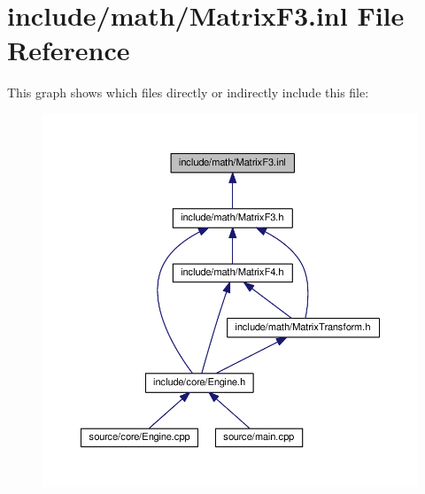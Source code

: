 \hypertarget{MatrixF3_8inl}{\section{include/math/\-Matrix\-F3.inl File Reference}
\label{MatrixF3_8inl}
}
This graph shows which files directly or indirectly include this file\-:
\nopagebreak
\begin{figure}[H]
\begin{center}
\leavevmode
\includegraphics[width=350pt]{MatrixF3_8inl__dep__incl}
\end{center}
\end{figure}
